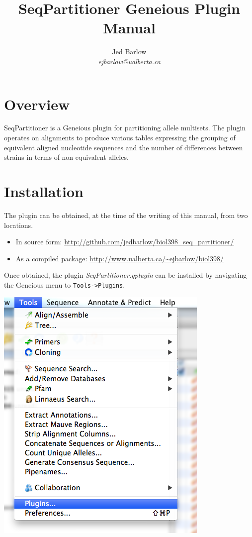 \documentclass[12pt,letterpaper]{article}
\author{
    Jed Barlow\\
    \textit{ejbarlow@ualberta.ca}
}
\title{SeqPartitioner Geneious Plugin Manual}
\begin{document}
\maketitle

\hfill

\tableofcontents

\newpage
\section{Overview}

SeqPartitioner is a Geneious plugin for partitioning allele multisets.  The
plugin operates on alignments to produce various tables expressing the grouping
of equivalent aligned nucleotide sequences and the number of differences
between strains in terms of non-equivalent alleles.

\section{Installation}
The plugin can be obtained, at the time of the writing of this manual, from two
locations.

\begin{itemize}
\item
    In source form: \url{http://github.com/jedbarlow/biol398\_seq\_partitioner/}
\item
    As a compiled package: \url{http://www.ualberta.ca/~ejbarlow/biol398/}
\end{itemize}

Once obtained, the plugin \textit{SeqPartitioner.gplugin} can be installed by
navigating the Geneious menu to \texttt{Tools->Plugins}.

\hfill

\includegraphics[resolution=130]{menu_entry_plugins.png}
\end{document}
